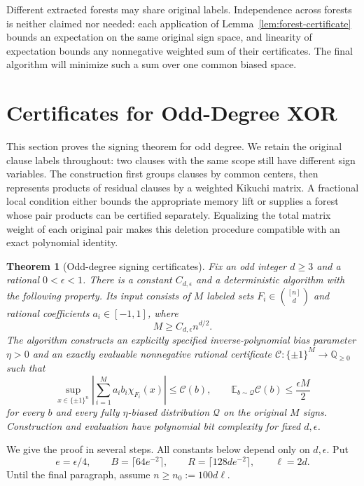 \documentclass[letterpaper,11pt]{article}
\newtheorem{theorem}{Theorem}
\theoremstyle{definition}
\newcommand{\E}{\mathbb E}
\begin{document}
Different extracted forests may share original labels.  Independence
across forests is neither claimed nor needed: each application of
Lemma~\ref{lem:forest-certificate} bounds an expectation on the same
original sign space, and linearity of expectation bounds any
nonnegative weighted sum of their certificates.  The final algorithm
will minimize such a sum over one common biased space.



\section{Certificates for Odd-Degree XOR}\label{sec:odd}

This section proves the signing theorem for odd degree.  We retain the
original clause labels throughout: two clauses with the same scope still
have different sign variables.  The construction first groups clauses by
common centers, then represents products of residual clauses by a weighted
Kikuchi matrix.  A fractional local condition either bounds the appropriate
memory lift or supplies a forest whose pair products can be certified
separately.  Equalizing the total matrix weight of each original pair makes
this deletion procedure compatible with an exact polynomial identity.

\begin{theorem}[Odd-degree signing certificates]\label{thm:odd-signing}
Fix an odd integer $d\geq3$ and a rational $0<\epsilon<1$.  There is a
constant $C_{d,\epsilon}$ and a deterministic algorithm with the following
property.  Its input consists of $M$ labeled sets $F_i\in\binom{[n]}d$ and
rational coefficients $a_i\in[-1,1]$, where
\[
 M\geq C_{d,\epsilon}n^{d/2}.
\]
The algorithm constructs an explicitly specified inverse-polynomial bias
parameter $\eta>0$ and an exactly evaluable nonnegative rational certificate
$\mathcal C:\{\pm1\}^M\to\mathbb Q_{\geq0}$ such that
\begin{equation}\label{odd:eq:certificate-theorem}
 \sup_{x\in\{\pm1\}^n}
 \left|\sum_{i=1}^M a_i b_i\chi_{F_i}(x)\right|
 \leq\mathcal C(b),\qquad
 \E_{b\sim\mathcal Q}\mathcal C(b)\leq\frac{\epsilon M}{2}
\end{equation}
for every $b$ and every fully $\eta$-biased distribution $\mathcal Q$ on
the original $M$ signs.  Construction and evaluation have polynomial bit
complexity for fixed $d,\epsilon$.
\end{theorem}

We give the proof in several steps.  All constants below depend only on
$d,\epsilon$.  Put
\begin{equation}\label{odd:eq:bundle-constants}
 e=\epsilon/4,\qquad
 B=\lceil64e^{-2}\rceil,\qquad
 R=\lceil128de^{-2}\rceil,\qquad \ell=2d.
\end{equation}
Until the final paragraph, assume $n\geq n_0:=100d\ell$.
\end{document}
